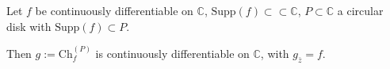 Let $f$ be continuously differentiable on $\mathbb{C}$, $\mathrm{Supp}(f) \subset \subset \mathbb{C}$, $P \subset \mathbb{C}$ a circular disk with $\mathrm{Supp}(f) \subset P$.

Then $g := \mathrm{Ch}_f^{(P)}$ is continuously differentiable on $\mathbb{C}$, with $g_{\bar{z}} = f$.
